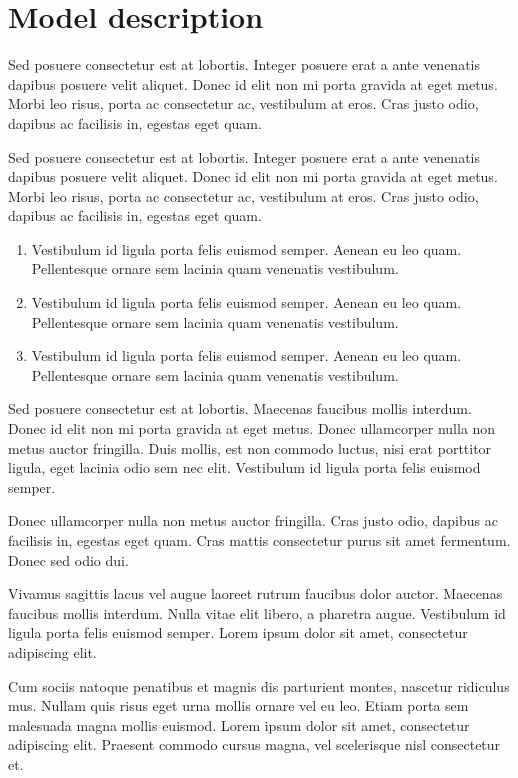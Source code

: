\documentclass[journal]{../template/IEEEtran}
\begin{document}
\section{Model description}

Sed posuere consectetur est at lobortis. Integer posuere erat a ante venenatis dapibus posuere velit aliquet. Donec id elit non mi porta gravida at eget metus. Morbi leo risus, porta ac consectetur ac, vestibulum at eros. Cras justo odio, dapibus ac facilisis in, egestas eget quam.

Sed posuere consectetur est at lobortis. Integer posuere erat a ante venenatis dapibus posuere velit aliquet. Donec id elit non mi porta gravida at eget metus. Morbi leo risus, porta ac consectetur ac, vestibulum at eros. Cras justo odio, dapibus ac facilisis in, egestas eget quam.

\begin{enumerate}
	\item Vestibulum id ligula porta felis euismod semper. Aenean eu leo quam. Pellentesque ornare sem lacinia quam venenatis vestibulum.
	\item Vestibulum id ligula porta felis euismod semper. Aenean eu leo quam. Pellentesque ornare sem lacinia quam venenatis vestibulum.
	\item Vestibulum id ligula porta felis euismod semper. Aenean eu leo quam. Pellentesque ornare sem lacinia quam venenatis vestibulum.
\end{enumerate}

Sed posuere consectetur est at lobortis. Maecenas faucibus mollis interdum. Donec id elit non mi porta gravida at eget metus. Donec ullamcorper nulla non metus auctor fringilla. Duis mollis, est non commodo luctus, nisi erat porttitor ligula, eget lacinia odio sem nec elit. Vestibulum id ligula porta felis euismod semper.

Donec ullamcorper nulla non metus auctor fringilla. Cras justo odio, dapibus ac facilisis in, egestas eget quam. Cras mattis consectetur purus sit amet fermentum. Donec sed odio dui.

Vivamus sagittis lacus vel augue laoreet rutrum faucibus dolor auctor. Maecenas faucibus mollis interdum. Nulla vitae elit libero, a pharetra augue. Vestibulum id ligula porta felis euismod semper. Lorem ipsum dolor sit amet, consectetur adipiscing elit.

Cum sociis natoque penatibus et magnis dis parturient montes, nascetur ridiculus mus. Nullam quis risus eget urna mollis ornare vel eu leo. Etiam porta sem malesuada magna mollis euismod. Lorem ipsum dolor sit amet, consectetur adipiscing elit. Praesent commodo cursus magna, vel scelerisque nisl consectetur et.
\end{document}
